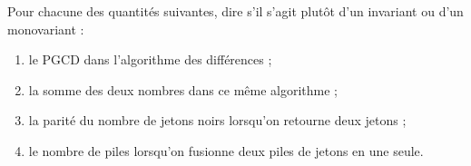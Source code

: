 Pour chacune des quantités suivantes, dire s'il s'agit plutôt d'un
invariant ou d'un monovariant :
\begin{enumerate}
  \item le PGCD dans l'algorithme des différences ;
  \item la somme des deux nombres dans ce même algorithme ;
  \item la parité du nombre de jetons noirs lorsqu'on retourne deux jetons ;
  \item le nombre de piles lorsqu'on fusionne deux piles de jetons en une seule.
\end{enumerate}
